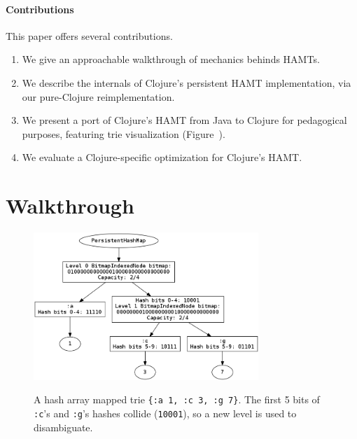 \documentclass[preprint]{sigplanconf}
\begin{document}
\paragraph{Contributions}
This paper offers several contributions.

\begin{enumerate}
  \item We give an approachable walkthrough of mechanics behinds
      HAMTs.
  \item We describe the internals of Clojure's persistent HAMT implementation,
    via our pure-Clojure reimplementation.
  \item We present a port of Clojure's HAMT from Java to Clojure
    for pedagogical purposes,
    featuring trie visualization (Figure~\label{port-visualize}).
  \item We evaluate a Clojure-specific optimization for Clojure's HAMT.
\end{enumerate}

\section{Walkthrough}
\label{walkthrough}

\begin{figure}
\includegraphics[width=8.5cm]{a-c-g-tree}
\label{port-visualize}
\caption{A hash array mapped trie \texttt{\{:a 1, :c 3, :g 7\}}.
The first 5 bits of \texttt{:c}'s and \texttt{:g}'s hashes
collide (\texttt{10001}), so a new level is used to disambiguate.
}
\end{figure}
\end{document}
